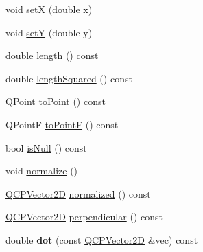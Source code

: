 \begin{DoxyCompactItemize}
\item 
void \hyperlink{class_q_c_p_vector2_d_ab4249e6ce7bfc37be56f014c54b761ae}{setX} (double x)
\item 
void \hyperlink{class_q_c_p_vector2_d_ada288019aa8cd51e3b30acfc07b461dc}{setY} (double y)
\item 
double \hyperlink{class_q_c_p_vector2_d_a27fa0549db12b6f204582f8119627d6a}{length} () const 
\item 
double \hyperlink{class_q_c_p_vector2_d_a1332fad5a1cc1cc93ce781f8c01264b5}{length\+Squared} () const 
\item 
Q\+Point \hyperlink{class_q_c_p_vector2_d_a2819d10ffc804ec01a124172ab529d97}{to\+Point} () const 
\item 
Q\+PointF \hyperlink{class_q_c_p_vector2_d_ad31741991d463ab8afa4ccb58af7308b}{to\+PointF} () const 
\item 
bool \hyperlink{class_q_c_p_vector2_d_ae096fb351096208281abea041cfcd3ec}{is\+Null} () const 
\item 
void \hyperlink{class_q_c_p_vector2_d_ad83268be370685c2a0630acc0fb1a425}{normalize} ()
\item 
\hyperlink{class_q_c_p_vector2_d}{Q\+C\+P\+Vector2D} \hyperlink{class_q_c_p_vector2_d_a98087a9a89eed142185c8b5d04309ad3}{normalized} () const 
\item 
\hyperlink{class_q_c_p_vector2_d}{Q\+C\+P\+Vector2D} \hyperlink{class_q_c_p_vector2_d_a4cdadb1cda3c522a5c14c3f92db78b2a}{perpendicular} () const 
\item 
double {\bfseries dot} (const \hyperlink{class_q_c_p_vector2_d}{Q\+C\+P\+Vector2D} \&vec) const \hypertarget{class_q_c_p_vector2_d_a2decf61d2230103055830ba749e72ed2}{}\label{class_q_c_p_vector2_d_a2decf61d2230103055830ba749e72ed2}


\end{DoxyCompactItemize}
